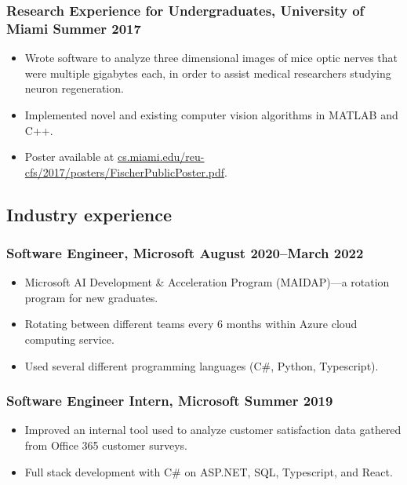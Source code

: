 \documentclass{article}
\begin{document}
		\subsubsection*{Research Experience for Undergraduates, University of Miami \hfill \normalfont \normalsize Summer 2017}
			\begin{itemize}
				\item Wrote software to analyze three dimensional images of mice optic nerves that were multiple gigabytes each, in order to assist medical researchers studying neuron regeneration.
				\item Implemented novel and existing computer vision algorithms in MATLAB and C++.
				\item Poster available at \href{http://cs.miami.edu/reu-cfs/2017/posters/FischerPublicPoster.pdf}{cs.miami.edu/reu-cfs/2017/posters/FischerPublicPoster.pdf}.
			\end{itemize}
	
	\subsection*{Industry experience}
		\subsubsection*{Software Engineer, Microsoft \hfill \normalfont \normalsize August 2020--March 2022}
		\begin{itemize}
			\item Microsoft AI Development \& Acceleration Program (MAIDAP)---a rotation program for new graduates.
			\item Rotating between different teams every 6 months within Azure cloud computing service.
			\item Used several different programming languages (C\#, Python, Typescript).
		\end{itemize}
		\subsubsection*{Software Engineer Intern, Microsoft \hfill \normalfont \normalsize Summer 2019}
		\begin{itemize}
			\item Improved an internal tool used to analyze customer satisfaction data gathered from Office 365 customer surveys.
			\item Full stack development with C\# on ASP.NET, SQL, Typescript, and React.
		\end{itemize}
\end{document}
